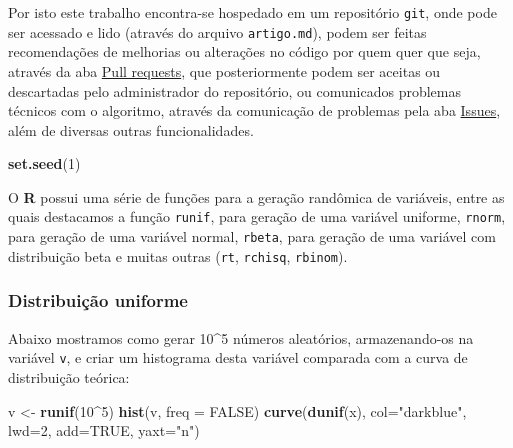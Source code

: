 \documentclass[a4paper]{article}
\newenvironment{Shaded}{\begin{snugshade}}{\end{snugshade}}
\newcommand{\KeywordTok}[1]{\textcolor[rgb]{0.13,0.29,0.53}{\textbf{#1}}}
\newcommand{\DataTypeTok}[1]{\textcolor[rgb]{0.13,0.29,0.53}{#1}}
\newcommand{\DecValTok}[1]{\textcolor[rgb]{0.00,0.00,0.81}{#1}}
\newcommand{\StringTok}[1]{\textcolor[rgb]{0.31,0.60,0.02}{#1}}
\newcommand{\OtherTok}[1]{\textcolor[rgb]{0.56,0.35,0.01}{#1}}
\newcommand{\OperatorTok}[1]{\textcolor[rgb]{0.81,0.36,0.00}{\textbf{#1}}}
\newcommand{\NormalTok}[1]{#1}
\begin{document}
Por isto este trabalho encontra-se hospedado em um repositório
\texttt{git}, onde pode ser acessado e lido (através do arquivo
\texttt{artigo.md}), podem ser feitas recomendações de melhorias ou
alterações no código por quem quer que seja, através da aba
\href{https://github.com/lfpdroubi/involutivo_vertical/pulls}{Pull
requests}, que posteriormente podem ser aceitas ou descartadas pelo
administrador do repositório, ou comunicados problemas técnicos com o
algoritmo, através da comunicação de problemas pela aba
\href{https://github.com/lfpdroubi/involutivo_vertical/issues}{Issues},
além de diversas outras funcionalidades.

\begin{Shaded}
\begin{Highlighting}[]
\KeywordTok{set.seed}\NormalTok{(}\DecValTok{1}\NormalTok{)}
\end{Highlighting}
\end{Shaded}

O \textbf{R} possui uma série de funções para a geração randômica de
variáveis, entre as quais destacamos a função \texttt{runif}, para
geração de uma variável uniforme, \texttt{rnorm}, para geração de uma
variável normal, \texttt{rbeta}, para geração de uma variável com
distribuição beta e muitas outras (\texttt{rt}, \texttt{rchisq},
\texttt{rbinom}).

\newpage

\subsubsection{Distribuição uniforme}\label{distribuicao-uniforme}

Abaixo mostramos como gerar 10\^{}5 números aleatórios, armazenando-os
na variável \texttt{v}, e criar um histograma desta variável comparada
com a curva de distribuição teórica:

\begin{Shaded}
\begin{Highlighting}[]
\NormalTok{v <-}\StringTok{ }\KeywordTok{runif}\NormalTok{(}\DecValTok{10}\OperatorTok{^}\DecValTok{5}\NormalTok{)}
\KeywordTok{hist}\NormalTok{(v, }\DataTypeTok{freq =} \OtherTok{FALSE}\NormalTok{)}
\KeywordTok{curve}\NormalTok{(}\KeywordTok{dunif}\NormalTok{(x),}
          \DataTypeTok{col=}\StringTok{"darkblue"}\NormalTok{, }\DataTypeTok{lwd=}\DecValTok{2}\NormalTok{, }\DataTypeTok{add=}\OtherTok{TRUE}\NormalTok{, }\DataTypeTok{yaxt=}\StringTok{"n"}\NormalTok{)}
\end{Highlighting}
\end{Shaded}
\end{document}
